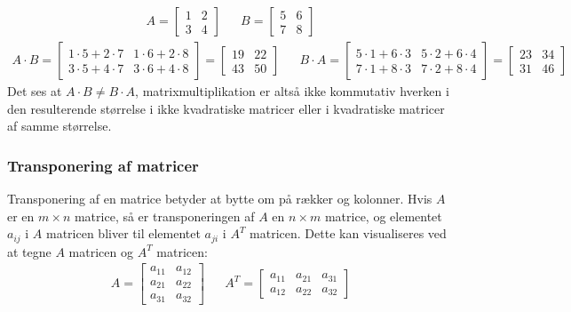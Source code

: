 \documentclass{article}
\begin{document}
\begin{align}
  A = \begin{bmatrix}
    1 & 2 \\
    3 & 4
  \end{bmatrix}
  &&
  B = \begin{bmatrix}
    5 & 6 \\
    7 & 8
  \end{bmatrix}
\end{align}
\begin{align}
  A \cdot B = \begin{bmatrix}
    1 \cdot 5 + 2 \cdot 7 & 1 \cdot 6 + 2 \cdot 8 \\
    3 \cdot 5 + 4 \cdot 7 & 3 \cdot 6 + 4 \cdot 8
  \end{bmatrix} = \begin{bmatrix}
    19 & 22 \\
    43 & 50
  \end{bmatrix}
  &&
  B \cdot A = \begin{bmatrix}
    5 \cdot 1 + 6 \cdot 3 & 5 \cdot 2 + 6 \cdot 4 \\
    7 \cdot 1 + 8 \cdot 3 & 7 \cdot 2 + 8 \cdot 4
  \end{bmatrix} = \begin{bmatrix}
    23 & 34 \\
    31 & 46
  \end{bmatrix}
\end{align}
Det ses at $A \cdot B \neq B \cdot A$, matrixmultiplikation er altså ikke kommutativ hverken i den resulterende størrelse i ikke kvadratiske matricer eller i kvadratiske matricer af samme størrelse. \parencite{Lauritzen_2019}
\subsubsection{Transponering af matricer}
Transponering af en matrice betyder at bytte om på rækker og kolonner. Hvis $A$ er en $m \times n$ matrice, så er transponeringen af $A$ en $n \times m$ matrice, og elementet $a_{ij}$ i $A$ matricen bliver til elementet $a_{ji}$ i $A^T$ matricen. Dette kan visualiseres ved at tegne $A$ matricen og $A^T$ matricen:
\begin{align}
  A = \begin{bmatrix}
    a_{11} & a_{12} \\
    a_{21} & a_{22} \\
    a_{31} & a_{32}
  \end{bmatrix}
  &&
  A^T = \begin{bmatrix}
    a_{11} & a_{21} & a_{31} \\
    a_{12} & a_{22} & a_{32}
  \end{bmatrix}
\end{align}
\end{document}
